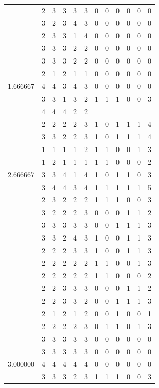 \documentclass[]{book}
\theoremstyle{definition}
\theoremstyle{definition}
\theoremstyle{definition}
\theoremstyle{remark}
\begin{document}
\begin{table}
{\begin{tabular}[t]{rrrrrrrrrrrr}
 & 2 & 3 & 3 & 3 & 3 & 0 & 0 & 0 & 0 & 0 & 0\\
 & 3 & 2 & 3 & 4 & 3 & 0 & 0 & 0 & 0 & 0 & 0\\
 & 2 & 3 & 3 & 1 & 4 & 0 & 0 & 0 & 0 & 0 & 0\\
 & 3 & 3 & 3 & 2 & 2 & 0 & 0 & 0 & 0 & 0 & 0\\
 & 3 & 3 & 3 & 2 & 2 & 0 & 0 & 0 & 0 & 0 & 0\\
 & 2 & 1 & 2 & 1 & 1 & 0 & 0 & 0 & 0 & 0 & 0\\
1.666667 & 4 & 4 & 3 & 4 & 3 & 0 & 0 & 0 & 0 & 0 & 0\\
 & 3 & 3 & 1 & 3 & 2 & 1 & 1 & 1 & 0 & 0 & 3\\
 & 4 & 4 & 4 & 2 & 2 &  &  &  &  &  & \\
 & 2 & 2 & 2 & 2 & 3 & 1 & 0 & 1 & 1 & 1 & 4\\
 & 3 & 3 & 2 & 2 & 3 & 1 & 0 & 1 & 1 & 1 & 4\\
 & 1 & 1 & 1 & 1 & 2 & 1 & 1 & 0 & 0 & 1 & 3\\
 & 1 & 2 & 1 & 1 & 1 & 1 & 1 & 0 & 0 & 0 & 2\\
2.666667 & 3 & 3 & 4 & 1 & 4 & 1 & 0 & 1 & 1 & 0 & 3\\
 & 3 & 4 & 4 & 3 & 4 & 1 & 1 & 1 & 1 & 1 & 5\\
 & 2 & 3 & 2 & 2 & 2 & 1 & 1 & 1 & 0 & 0 & 3\\
 & 3 & 2 & 2 & 2 & 3 & 0 & 0 & 0 & 1 & 1 & 2\\
 & 3 & 3 & 3 & 3 & 3 & 0 & 0 & 1 & 1 & 1 & 3\\
 & 3 & 3 & 2 & 4 & 3 & 1 & 0 & 0 & 1 & 1 & 3\\
 & 2 & 2 & 2 & 3 & 3 & 1 & 0 & 0 & 1 & 1 & 3\\
 & 2 & 2 & 2 & 2 & 2 & 1 & 1 & 0 & 0 & 1 & 3\\
 & 2 & 2 & 2 & 2 & 2 & 1 & 1 & 0 & 0 & 0 & 2\\
 & 2 & 2 & 3 & 3 & 3 & 0 & 0 & 0 & 1 & 1 & 2\\
 & 2 & 2 & 3 & 3 & 2 & 0 & 0 & 1 & 1 & 1 & 3\\
 & 2 & 1 & 2 & 1 & 2 & 0 & 0 & 1 & 0 & 0 & 1\\
 & 2 & 2 & 2 & 2 & 3 & 0 & 1 & 1 & 0 & 1 & 3\\
 & 3 & 3 & 3 & 3 & 3 & 0 & 0 & 0 & 0 & 0 & 0\\
 & 3 & 3 & 3 & 3 & 3 & 0 & 0 & 0 & 0 & 0 & 0\\
3.000000 & 4 & 4 & 4 & 4 & 4 & 0 & 0 & 0 & 0 & 0 & 0\\
 & 3 & 3 & 3 & 2 & 3 & 1 & 1 & 1 & 0 & 0 & 3\\

\end{tabular}}
\end{table}
\end{document}
